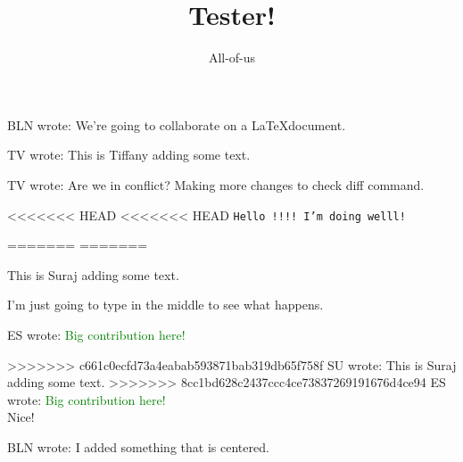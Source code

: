 \documentclass[12pt]{article}
\title{Tester!}
\author{All-of-us}
\newcommand{\bln}[1]{BLN wrote: \textcolor{red!70!blue!70}{#1}}
\newcommand{\tv}[1]{TV wrote: \textcolor{blue!70}{#1}}
\newcommand{\su}[1]{SU wrote: \textcolor{green!70}{#1}}
\newcommand{\es}[1]{ES wrote: \textcolor{green}{#1}}
\begin{document}
\maketitle

\bln{We're going to collaborate on a \LaTeX document.}

\tv{This is Tiffany adding some text.}

\tv{Are we in conflict? Making more changes to check diff command.}

<<<<<<< HEAD
<<<<<<< HEAD
\tt Hello !!!! I'm doing welll!

=======
=======

{This is Suraj adding some text.}

I'm just going to type in the middle to see what happens.

\es{Big contribution here!}

>>>>>>> c661c0ecfd73a4eabab593871bab319db65f758f
\su{This is Suraj adding some text.}
>>>>>>> 8cc1bd628c2437ccc4ce73837269191676d4ce94
\es{Big contribution here!}\\
{Nice!}



\begin{center}
  \bln{I added something that is centered.}
\end{center}
\end{document}
